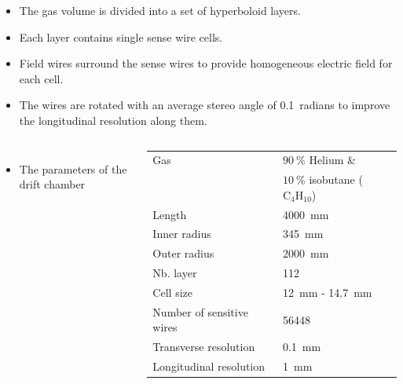 \documentclass[final,xcolor={dvipsnames,svgnames,x11names,table}]{beamer}
\begin{document}
\begin{frame}
\begin{textblock}{43}
\begin{tcolorbox}[title=The IDEA drift chamber]
    \begin{itemize}
      \item The gas volume is divided into a set of hyperboloid layers. \vspace{0.2cm}
      \item Each layer contains single sense wire cells. \vspace{0.2cm}
      \item Field wires surround the sense wires to provide homogeneous electric field for each cell. \vspace{0.2cm}
      \item The wires are rotated with an average stereo angle of 0.1~radians to improve the longitudinal resolution along them. \vspace{0.2cm}
    \end{itemize}

    \begin{columns}
      \begin{itemize}
        \item The parameters of the drift chamber \vspace{0.5cm}
      \end{itemize}

      \centering
      \begin{adjustbox}{max width=0.8\textwidth}
        \begin{tabular}{l l}
          \toprule
            Gas & $90~\%$ Helium \&\\
            & $10~\%$ isobutane ($\text{C}_{4}\text{H}_{10}$) \\
            Length & 4000~mm \\
            Inner radius & 345~mm \\
            Outer radius & 2000~mm\\
            Nb. layer & 112 \\
            Cell size & 12~mm - 14.7~mm \\
            Number of sensitive wires & 56448 \\
            Transverse resolution & 0.1~mm \\
            Longitudinal resolution & 1~mm \\
          \bottomrule
        \end{tabular}
      \end{adjustbox}


\end{columns}
\end{tcolorbox}
\end{textblock}
\end{frame}
\end{document}
